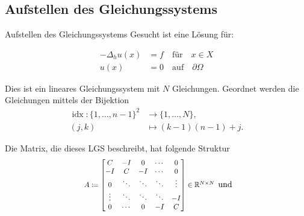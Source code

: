 \documentclass[9pt, t]{beamer}
\begin{document}
\subsection{Aufstellen des Gleichungssystems}
\begin{frame}{Aufstellen des Gleichungssystems}
    Gesucht ist eine Lösung für:

    \begin{align*}
        -\Delta_h u(x) & = f \quad \text{für} \quad x \in X
        \\
        u(x)           & = 0 \quad \text{auf} \quad \partial \Omega
    \end{align*}

    Dies ist ein lineares Gleichungssystem mit \(N\) Gleichungen. Geordnet
    werden die Gleichungen mittels der Bijektion
    \begin{align*}
        \operatorname{idx}: \{1, \ldots, n - 1\}^2 & \longrightarrow \{1, \ldots , N\}, \\
        (j, k)                                     & \longmapsto (k - 1)(n - 1) + j.
    \end{align*}

    Die Matrix, die dieses LGS beschreibt, hat folgende Struktur
    \[
        \begin{array}{ccc}
            \scalebox{0.85}{$
                    \begin{array}{l}
                        A \coloneq \begin{bmatrix}
                                       C      & -I     & 0      & \cdots & 0      \\
                                       -I     & C      & -I     & \cdots & 0      \\
                                       0      & \ddots & \ddots & \ddots & \vdots \\
                                       \vdots & \ddots & \ddots & \ddots & -I     \\
                                       0      & \cdots & 0      & -I     & C
                                   \end{bmatrix}
                        \in \mathbb{R}^{N \times N}
                    \end{array}
                $}

            \text{und}


\end{array}\]
\end{frame}
\end{document}
